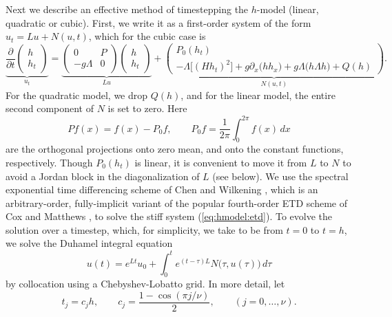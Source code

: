 \documentclass[11pt]{article}
\theoremstyle{plain}
\theoremstyle{definition}
\theoremstyle{definition}
\newcommand{\pa}{\partial}
\newcommand{\jd}{\displaystyle}
\newcommand{\der}[2]{\frac{\partial #1}{\partial #2}}
\begin{document}
Next we describe an effective method of timestepping the $h$-model
(linear, quadratic or cubic). First, we write it as a first-order
system of the form $u_t=Lu+N(u,t)$, which for the cubic case is
%
\begin{equation}\label{eq:hmodel:etd}
  \underbrace{\der{}{t}\begin{pmatrix} h \\ h_t \end{pmatrix}}_{\jd u_t} =
  \underbrace{\begin{pmatrix} 0 & P \\ -g\Lambda & 0 \end{pmatrix}
  \begin{pmatrix} h \\ h_t \end{pmatrix}}_{\jd Lu} +
  \underbrace{\begin{pmatrix} P_0(h_t) \\ -\Lambda\big[(Hh_t)^2\big]
      + g\pa_x\big(hh_x\big) + g\Lambda\big(h\Lambda h\big)
    + Q(h) \end{pmatrix}}_{\jd N(u,t)}.
\end{equation}
%
For the quadratic model, we drop $Q(h)$, and for the linear model, the entire
second component of $N$ is set to zero.  Here
%
\begin{equation}
  Pf(x) = f(x) - P_0f, \qquad P_0f = \frac1{2\pi}\int_0^{2\pi}f(x)\,dx
\end{equation}
%
are the orthogonal projections onto zero mean, and onto the constant
functions, respectively. Though $P_0(h_t)$ is linear, it is convenient
to move it from $L$ to $N$ to avoid a Jordan block in the
diagonalization of $L$ (see below). We use the spectral exponential
time differencing scheme of Chen and Wilkening
\cite{chen-wilkening:setd}, which is an arbitrary-order,
fully-implicit variant of the popular fourth-order ETD scheme of Cox
and Matthews \cite{cox-matthews:etd-2002, kassam-trefethen:etd-2006},
to solve the stiff system (\ref{eq:hmodel:etd}). To evolve the
solution over a timestep, which, for simplicity, we take to be from
$t=0$ to $t=h$, we solve the Duhamel integral equation
%
\begin{equation}
  u(t) = e^{Lt}u_0 + \int_0^t e^{(t-\tau)L} N\big(\tau,u(\tau)\big)\,d\tau
\end{equation}
%
by collocation using a Chebyshev-Lobatto grid. In more detail, let
%
\begin{equation}
  t_j = c_j h, \qquad c_j = \frac{1-\cos(\pi j/\nu)}2, \qquad (j=0,\dots,\nu).
\end{equation}
\end{document}
